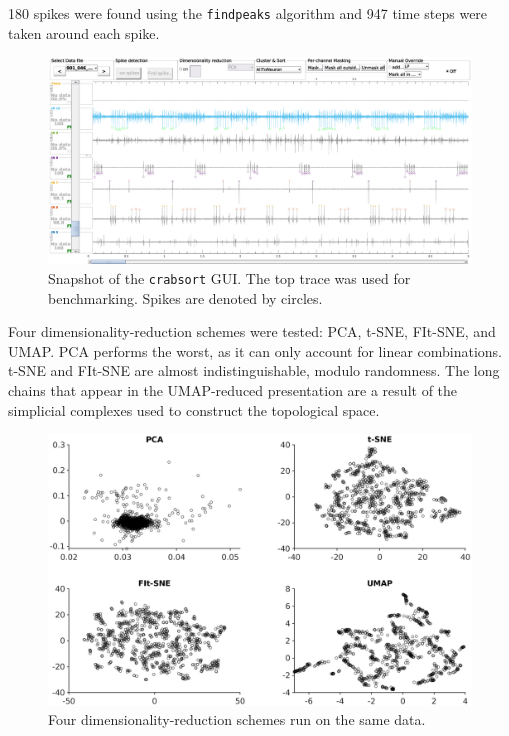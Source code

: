 \documentclass{article}
\begin{document}
180 spikes were found using the \texttt{findpeaks} algorithm
and 947 time steps were taken around each spike.

\begin{figure}
  \centering
  \includegraphics[width=\textwidth]{gfx/crabsort.eps}
  \caption{Snapshot of the \texttt{crabsort} GUI. The top trace was used for benchmarking. Spikes are denoted by circles.}
  \label{fig:crabsort}
\end{figure}

Four dimensionality-reduction schemes were tested: PCA, t-SNE, FIt-SNE, and UMAP.
PCA performs the worst, as it can only account for linear combinations.
t-SNE and FIt-SNE are almost indistinguishable, modulo randomness.
The long chains that appear in the UMAP-reduced presentation are a result of
the simplicial complexes used to construct the topological space.

\begin{figure}
  \centering
  \includegraphics[width=\textwidth]{gfx/dim-red.eps}
  \caption{Four dimensionality-reduction schemes run on the same data.}
  \label{fig:dim-red-comparison}
\end{figure}
\end{document}
